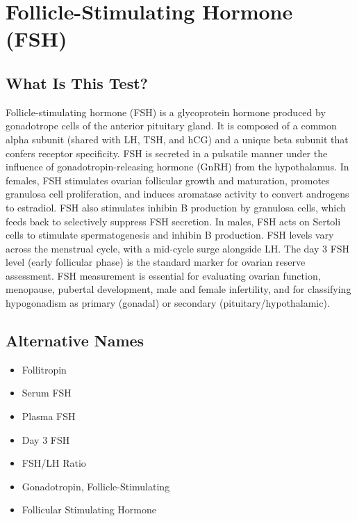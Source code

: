 \chapter{Follicle-Stimulating Hormone (FSH)}

\section*{What Is This Test?}
Follicle-stimulating hormone (FSH) is a glycoprotein hormone produced by gonadotrope cells of the anterior pituitary gland. It is composed of a common alpha subunit (shared with LH, TSH, and hCG) and a unique beta subunit that confers receptor specificity. FSH is secreted in a pulsatile manner under the influence of gonadotropin-releasing hormone (GnRH) from the hypothalamus. In females, FSH stimulates ovarian follicular growth and maturation, promotes granulosa cell proliferation, and induces aromatase activity to convert androgens to estradiol. FSH also stimulates inhibin B production by granulosa cells, which feeds back to selectively suppress FSH secretion. In males, FSH acts on Sertoli cells to stimulate spermatogenesis and inhibin B production. FSH levels vary across the menstrual cycle, with a mid-cycle surge alongside LH. The day 3 FSH level (early follicular phase) is the standard marker for ovarian reserve assessment. FSH measurement is essential for evaluating ovarian function, menopause, pubertal development, male and female infertility, and for classifying hypogonadism as primary (gonadal) or secondary (pituitary/hypothalamic).

\section*{Alternative Names}
\begin{itemize}
  \item Follitropin
  \item Serum FSH
  \item Plasma FSH
  \item Day 3 FSH
  \item FSH/LH Ratio
  \item Gonadotropin, Follicle-Stimulating
  \item Follicular Stimulating Hormone
\end{itemize}
